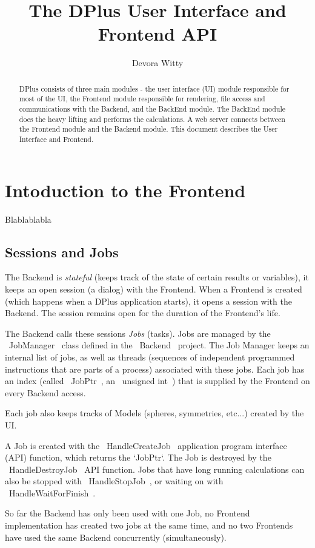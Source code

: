 \documentclass[12pt]{article}
\title{The DPlus User Interface and Frontend API}
\author{Devora Witty}
\begin{document}
	
\maketitle

\begin{abstract}
DPlus consists of three main modules - the user interface (UI) module responsible for most of the UI, the Frontend module responsible for rendering, file access and communications with the Backend, and the BackEnd module. The BackEnd module does the heavy lifting and performs the calculations. A web server connects between the Frontend module and the Backend module. This document describes the User Interface and Frontend.
\end{abstract}

\section{Intoduction to the Frontend}
Blablablabla 
 
\subsection{Sessions and Jobs}
The Backend is \emph{stateful} (keeps track of the state of certain results or variables), it keeps an open session (a dialog) with the Frontend. When a Frontend is created (which happens when a DPlus application starts), it opens a session with the Backend. The session remains open for the duration of the Frontend's life.

The Backend calls these sessions \emph{Jobs} (tasks). Jobs are managed by the ~JobManager~ class defined in the ~Backend~ project. The Job Manager keeps an internal list of jobs, as well as threads (sequences of independent programmed instructions that are parts of a process) associated with these jobs. Each job has an index (called ~JobPtr~, an ~unsigned int~) that is supplied by the Frontend on every Backend access.

Each job also keeps tracks of Models (spheres, symmetries, etc...) created by the UI. 

A Job is created with the ~HandleCreateJob~ application program interface (API) function, which returns the `JobPtr`. The Job is destroyed by the ~HandleDestroyJob~ API function. Jobs that have long running calculations can also be stopped with ~HandleStopJob~, or waiting on with ~HandleWaitForFinish~.

So far the Backend has only been used with one Job, no Frontend implementation has created two jobs at the same time, and no two Frontends have used the same Backend concurrently (simultaneously).
\end{document}
